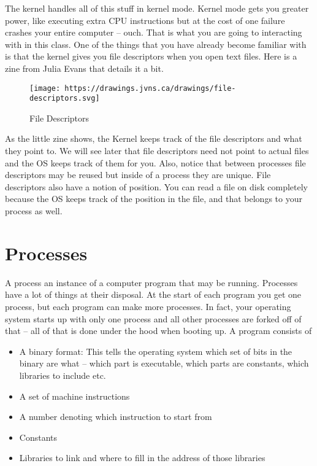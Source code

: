 The kernel handles all of this stuff in kernel mode. Kernel mode gets you greater power, like executing extra CPU instructions but at the cost of one failure crashes your entire computer -- ouch. That is what you are going to interacting with in this class. One of the things that you have already become familiar with is that the kernel gives you file descriptors when you open text files. Here is a zine from Julia Evans that details it a bit.

\begin{figure}[htbp]
\centering
\texttt{[image: https://drawings.jvns.ca/drawings/file-descriptors.svg]}
\caption{File Descriptors}
\end{figure}

As the little zine shows, the Kernel keeps track of the file descriptors and what they point to. We will see later that file descriptors need not point to actual files and the OS keeps track of them for you. Also, notice that between processes file descriptors may be reused but inside of a process they are unique. File descriptors also have a notion of position. You can read a file on disk completely because the OS keeps track of the position in the file, and that belongs to your process as well.

\section{Processes}\label{processes}

A process an instance of a computer program that may be running. Processes have a lot of things at their disposal. At the start of each program you get one process, but each program can make more processes. In fact, your operating system starts up with only one process and all other processes are forked off of that -- all of that is done under the hood when booting up. A program consists of

\begin{itemize}
\item A binary format: This tells the operating system which set of bits in the binary are what -- which part is executable, which parts are constants, which libraries to include etc. 
\item A set of machine instructions 
\item A number denoting which instruction to start from
\item Constants
\item Libraries to link and where to fill in the address of those libraries
\end{itemize}

